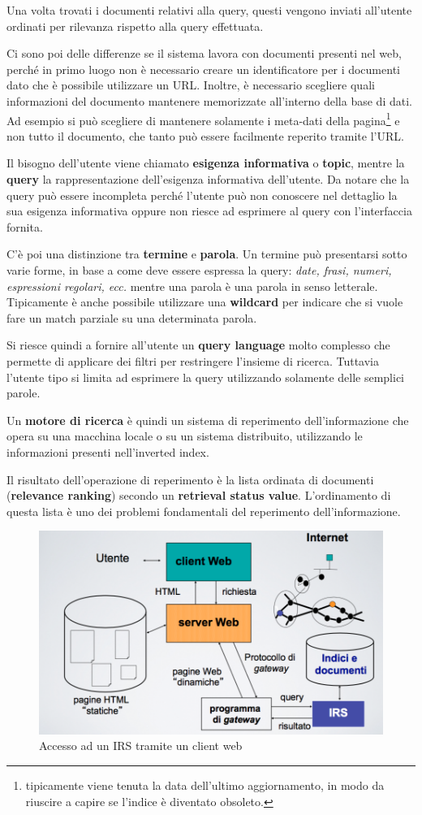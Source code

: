 Una volta trovati i documenti relativi alla query, questi vengono inviati all'utente ordinati per rilevanza rispetto alla query effettuata.

Ci sono poi delle differenze se il sistema lavora con documenti presenti nel web, perché in primo luogo non è necessario creare un identificatore per i documenti dato che è possibile utilizzare un URL.
Inoltre, è necessario scegliere quali informazioni del documento mantenere memorizzate all'interno della base di dati. Ad esempio si può scegliere di mantenere solamente i meta-dati della pagina\footnote{tipicamente viene tenuta la data dell'ultimo aggiornamento, in modo da riuscire a capire se l'indice è diventato obsoleto.} e non tutto il documento, che tanto può essere facilmente reperito tramite l'URL.

Il bisogno dell'utente viene chiamato \textbf{esigenza informativa} o \textbf{topic}, mentre la \textbf{query} la rappresentazione dell'esigenza informativa dell'utente.
Da notare che la query può essere incompleta perché l'utente può non conoscere nel dettaglio la sua esigenza informativa oppure non riesce ad esprimere al query con l'interfaccia fornita.

C'è poi una distinzione tra \textbf{termine} e \textbf{parola}. Un termine può presentarsi sotto varie forme, in base a come deve essere espressa la query: \textit{date, frasi, numeri, espressioni regolari, ecc.} mentre una parola è una parola in senso letterale.
Tipicamente è anche possibile utilizzare una \textbf{wildcard} per indicare che si vuole fare un match parziale su una determinata parola.

Si riesce quindi a fornire all'utente un \textbf{query language} molto complesso che permette di applicare dei filtri per restringere l'insieme di ricerca. Tuttavia l'utente tipo si limita ad esprimere la query utilizzando solamente delle semplici parole.

Un \textbf{motore di ricerca} è quindi un sistema di reperimento dell'informazione che opera su una macchina locale o su un sistema distribuito, utilizzando le informazioni presenti nell'inverted index.

Il risultato dell'operazione di reperimento è la lista ordinata di documenti (\textbf{relevance ranking}) secondo un \textbf{retrieval status value}.
L'ordinamento di questa lista è uno dei problemi fondamentali del reperimento dell'informazione.

\begin{figure}[htbp]
	\centering
	\includegraphics[width=.6\textwidth]{images/l2-irsweb.png}
	\caption{Accesso ad un IRS tramite un client web}
\end{figure}

